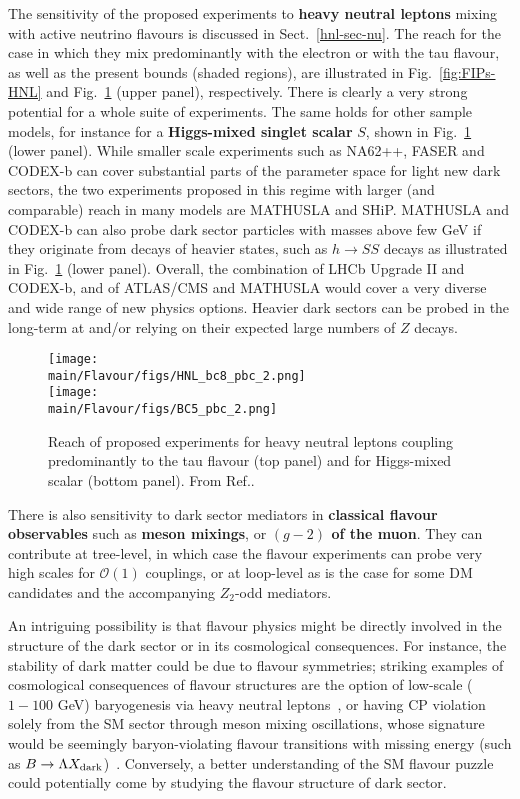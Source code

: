 The  sensitivity of the proposed experiments  to {\bf heavy neutral leptons} mixing with active neutrino flavours is discussed in Sect.~\ref{hnl-sec-nu}.  The  reach for the case in which they mix predominantly with the electron or with the tau flavour, as well as the present bounds (shaded regions), are  illustrated in Fig.~\ref{fig:FIPs-HNL} and  Fig.~\ref{fig:dark:daulepton} (upper panel), respectively.  There is clearly a very strong potential for a whole suite of experiments. 
The same holds for other sample models, for instance for a {\bf Higgs-mixed singlet scalar} $S$, shown in Fig.~\ref{fig:dark:daulepton} (lower panel). While smaller scale experiments such as NA62++, FASER and CODEX-b can cover substantial parts of the parameter space for light new dark sectors, the two
 experiments proposed in this regime
  with larger (and comparable) reach in many models  
 are MATHUSLA and SHiP. MATHUSLA and CODEX-b can also probe dark sector particles with masses above few GeV if they originate from decays of heavier states, such as $h\to SS$ decays as illustrated in  Fig.~\ref{fig:dark:daulepton} (lower panel). Overall, the combination of LHCb Upgrade II and CODEX-b, and of ATLAS/CMS and MATHUSLA would cover a very diverse and wide range of new physics options. Heavier dark sectors can be probed in the long-term at \FCCee and/or \CEPC relying on their expected large numbers of $Z$ decays. 


\begin{figure}[t]
	\centering 
	\texttt{[image: \\main/Flavour/figs/HNL\_bc8\_pbc\_2.png]}\\
	\texttt{[image: \\main/Flavour/figs/BC5\_pbc\_2.png]}
	\caption{Reach of proposed experiments for heavy neutral leptons coupling predominantly to the tau flavour (top panel) and for Higgs-mixed scalar (bottom panel). From Ref.\cite{Beacham:2019nyx}.	
	\label{fig:dark:daulepton}}
\end{figure}

There is also sensitivity to dark sector mediators in \textbf{classical flavour observables} such as \textbf{meson mixings},  or \textbf{${(g-2)}$ of the muon}. They can contribute at tree-level, in which case the flavour experiments can probe very high scales for ${\mathcal O}(1)$ couplings, or at loop-level as is the case for some   DM candidates and the accompanying $Z_2$-odd mediators. 

An intriguing possibility is that flavour physics might be directly involved in the structure of the dark sector or in its cosmological consequences. For instance, the stability of dark matter could be due to flavour symmetries; striking examples of cosmological consequences of flavour structures are the option of low-scale ($1-100$ GeV) baryogenesis via heavy neutral leptons~\cite{Akhmedov:1998qx,Asaka:2005pn}, or 
having CP violation solely from the SM sector through meson mixing oscillations, whose signature would be seemingly baryon-violating flavour transitions with missing energy (such as $B\to \Lambda 
X_{\rm dark}$)~\cite{Nelson:2019fln,Elor:2018twp}. 
 Conversely, a better understanding of 
 the SM flavour puzzle could potentially come by studying the flavour structure of dark sector.


